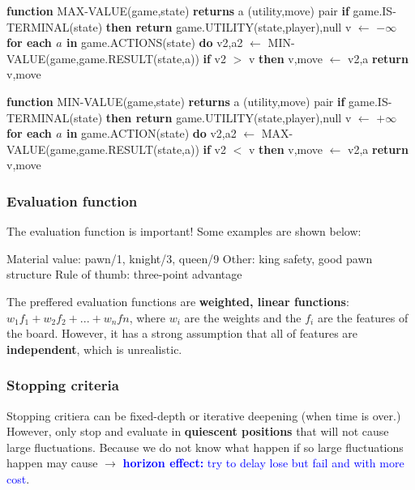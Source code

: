 \tabto{0mm} \textbf{function} MAX-VALUE(game,state) \textbf{returns} a (utility,move) pair
\tabto{5mm} \textbf{if} game.IS-TERMINAL(state) \textbf{then return} game.UTILITY(state,player),null
\tabto{5mm} v $\leftarrow$ $- \infty$
\tabto{5mm} \textbf{for each $a$ in} game.ACTIONS(state) \textbf{do}
\tabto{10mm} v2,a2 $\leftarrow$ MIN-VALUE(game,game.RESULT(state,a))
\tabto{10mm} \textbf{if} v2 $>$ v \textbf{then}
\tabto{15mm} v,move $\leftarrow$ v2,a
\tabto{5mm} \textbf{return} v,move

\tabto{0mm} \textbf{function} MIN-VALUE(game,state) \textbf{returns} a (utility,move) pair
\tabto{5mm} \textbf{if} game.IS-TERMINAL(state) \textbf{then return} game.UTILITY(state,player),null
\tabto{5mm} v $\leftarrow$ $+ \infty$
\tabto{5mm} \textbf{for each $a$ in} game.ACTION(state) \textbf{do}
\tabto{10mm} v2,a2 $\leftarrow$ MAX-VALUE(game,game.RESULT(state,a))
\tabto{10mm} \textbf{if} v2 $<$ v \textbf{then}
\tabto{15mm} v,move $\leftarrow$ v2,a
\tabto{5mm} \textbf{return} v,move

\subsubsection{Evaluation function}
The evaluation function is important! Some examples are shown below:
\begin{outline}
    \1 Material value: pawn/1, knight/3, queen/9
    \1 Other: king safety, good pawn structure
    \1 Rule of thumb: three-point advantage
\end{outline}

\noindent
The preffered evaluation functions are \textbf{weighted, linear functions}: $w_{1}f_{1} + w_{2}f_{2} + ... + w_{n}f{n}$, where $w_{i}$ are the weights and the $f_{i}$ are the features of the board. However, it has a strong assumption that all of features are \textbf{independent}, which is unrealistic.

\subsubsection{Stopping criteria}
Stopping critiera can be fixed-depth or iterative deepening (when time is over.) However, only stop and evaluate in \textbf{quiescent positions} that will not cause large fluctuations. Because we do not know what happen if so large fluctuations happen may cause $\rightarrow$ \textcolor{blue}{\textbf{horizon effect:} try to delay lose but fail and with more cost}.

